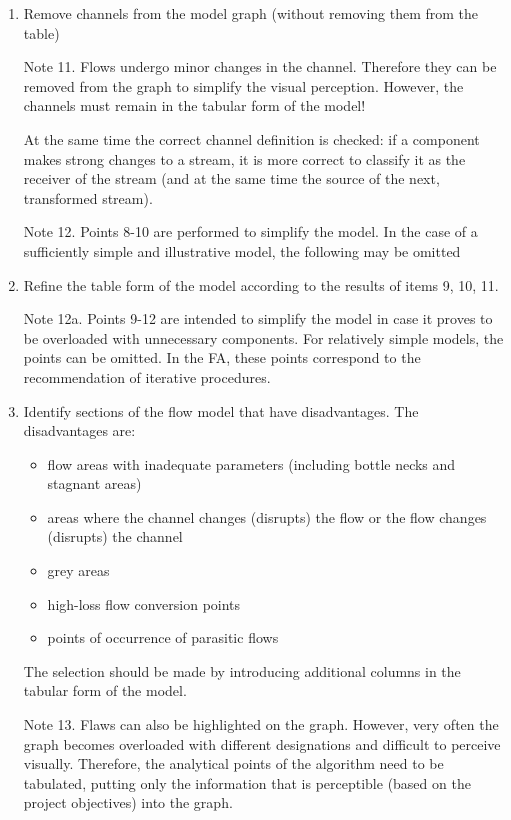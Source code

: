 \documentclass[a4paper,11pt]{article}
\begin{document}
\begin{enumerate}
\item Remove channels from the model graph (without removing them from the
  table)

  Note 11. Flows undergo minor changes in the channel. Therefore they can be
  removed from the graph to simplify the visual perception. However, the
  channels must remain in the tabular form of the model!

  At the same time the correct channel definition is checked: if a component
  makes strong changes to a stream, it is more correct to classify it as the
  receiver of the stream (and at the same time the source of the next,
  transformed stream).

  Note 12. Points 8-10 are performed to simplify the model. In the case of a
  sufficiently simple and illustrative model, the following may be omitted

\item Refine the table form of the model according to the results of items 9,
  10, 11. 

  Note 12a. Points 9-12 are intended to simplify the model in case it proves
  to be overloaded with unnecessary components. For relatively simple models,
  the points can be omitted. In the FA, these points correspond to the
  recommendation of iterative procedures.

\item Identify sections of the flow model that have disadvantages. The
  disadvantages are:
  \begin{itemize}
  \item flow areas with inadequate parameters (including bottle necks and
    stagnant areas)
  \item areas where the channel changes (disrupts) the flow or the flow
    changes (disrupts) the channel
  \item grey areas
  \item high-loss flow conversion points
  \item points of occurrence of parasitic flows
  \end{itemize}
  The selection should be made by introducing additional columns in the
  tabular form of the model.

  Note 13. Flaws can also be highlighted on the graph. However, very often the
  graph becomes overloaded with different designations and difficult to
  perceive visually. Therefore, the analytical points of the algorithm need to
  be tabulated, putting only the information that is perceptible (based on the
  project objectives) into the graph.


\end{enumerate}
\end{document}
